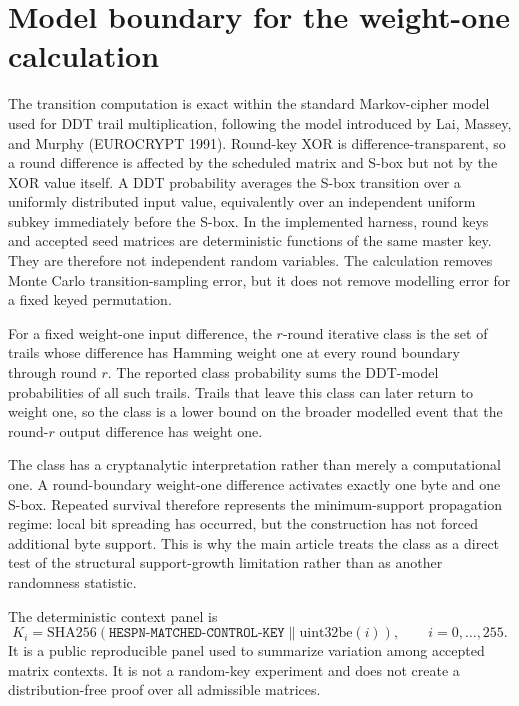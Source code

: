 \documentclass[cryptography,supfile,submit,oneauthor]{Definitions/mdpi}
\begin{document}
\section{Model boundary for the weight-one calculation}
The transition computation is exact within the standard Markov-cipher model used for DDT trail multiplication, following the model introduced by Lai, Massey, and Murphy (EUROCRYPT 1991). Round-key XOR is difference-transparent, so a round difference is affected by the scheduled matrix and S-box but not by the XOR value itself. A DDT probability averages the S-box transition over a uniformly distributed input value, equivalently over an independent uniform subkey immediately before the S-box. In the implemented harness, round keys and accepted seed matrices are deterministic functions of the same master key. They are therefore not independent random variables. The calculation removes Monte Carlo transition-sampling error, but it does not remove modelling error for a fixed keyed permutation.

For a fixed weight-one input difference, the $r$-round iterative class is the set of trails whose difference has Hamming weight one at every round boundary through round $r$. The reported class probability sums the DDT-model probabilities of all such trails. Trails that leave this class can later return to weight one, so the class is a lower bound on the broader modelled event that the round-$r$ output difference has weight one.

The class has a cryptanalytic interpretation rather than merely a computational one. A round-boundary weight-one difference activates exactly one byte and one S-box. Repeated survival therefore represents the minimum-support propagation regime: local bit spreading has occurred, but the construction has not forced additional byte support. This is why the main article treats the class as a direct test of the structural support-growth limitation rather than as another randomness statistic.

The deterministic context panel is
\[
K_i=\mathrm{SHA256}(\texttt{HESPN-MATCHED-CONTROL-KEY}\parallel\mathrm{uint32be}(i)),\qquad i=0,\ldots,255.
\]
It is a public reproducible panel used to summarize variation among accepted matrix contexts. It is not a random-key experiment and does not create a distribution-free proof over all admissible matrices.
\end{document}
